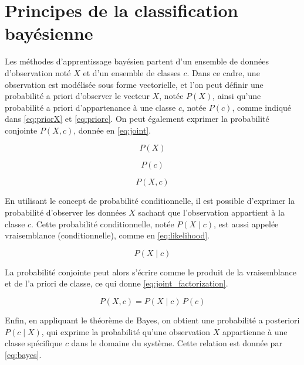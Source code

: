 

\section{Principes de la classiﬁcation bayésienne}

Les méthodes d’apprentissage bayésien partent d’un ensemble de données d’observation noté \(X\) et d’un ensemble de classes \(c\). Dans ce cadre, une observation est modélisée sous forme vectorielle, et l’on peut définir une probabilité a priori d’observer le vecteur \(X\), notée \(P(X)\), ainsi qu’une probabilité a priori d’appartenance à une classe \(c\), notée \(P(c)\), comme indiqué dans \eqref{eq:priorX} et \eqref{eq:priorc}. On peut également exprimer la probabilité conjointe \(P(X,c)\), donnée en \eqref{eq:joint}.

\begin{equation}
\label{eq:priorX}
P(X)
\end{equation}

\begin{equation}
\label{eq:priorc}
P(c)
\end{equation}

\begin{equation}
\label{eq:joint}
P(X,c)
\end{equation}

En utilisant le concept de probabilité conditionnelle, il est possible d’exprimer la probabilité d’observer les données \(X\) sachant que l’observation appartient à la classe \(c\). Cette probabilité conditionnelle, notée \(P(X\mid c)\), est aussi appelée vraisemblance (conditionnelle), comme en \eqref{eq:likelihood}.

\begin{equation}
\label{eq:likelihood}
P(X\mid c)
\end{equation}

La probabilité conjointe peut alors s’écrire comme le produit de la vraisemblance et de l’a priori de classe, ce qui donne \eqref{eq:joint_factorization}.

\begin{equation}
\label{eq:joint_factorization}
P(X,c)=P(X\mid c)\,P(c)
\end{equation}

Enfin, en appliquant le théorème de Bayes, on obtient une probabilité a posteriori \(P(c\mid X)\), qui exprime la probabilité qu’une observation \(X\) appartienne à une classe spécifique \(c\) dans le domaine du système. Cette relation est donnée par \eqref{eq:bayes}.

